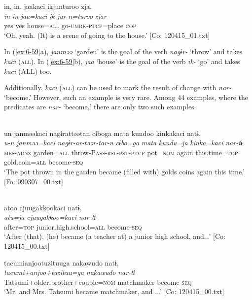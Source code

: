 {\TM}
\glll in,  in.  jaakaci  ikjunturoo  zja.\\
      \textit{in}  \textit{in}  \textit{jaa=kaci}  \textit{ik-jur-n=turoo}  \textit{zjar}\\
      yes  yes  house=\textsc{all}  go-\textsc{umrk}-\textsc{ptcp}=place  \textsc{cop}\\
\glt ‘Oh, yeah. (It) is a scene of going to the house.’ [Co: 120415\_01.txt]
\z

In (\ref{ex:6-59}a), \textit{janməə} ‘garden’ is the goal of the verb \textit{nagɨr-} ‘throw’ and takes \textit{kaci} (\textsc{all}). In (\ref{ex:6-59}b), \textit{jaa} ‘house’ is the goal of the verb \textit{ik-} ‘go’ and takes \textit{kaci} (ALL) too.

Additionally, \textit{kaci} (\textsc{all}) can be used to mark the result of change with \textit{nar-} ‘become.’ However, such an example is very rare. Among 44 examples, where the predicates are \textit{nar-} ‘become,’ there are only two such examples.

\ea\label{ex:6-60}
\ea{}\\
{\TM}
\glll  un  janməəkaci  nagɨrattəətan  cɨboga mata  kundoo  kinkakaci  natɨ,\\
\textit{u-n}  \textit{janməə=kaci}  \textit{nagɨr-ar-təər-tar-n}  \textit{cɨbo=ga} \textit{mata}  \textit{kundu=ja}  \textit{kinka=kaci}  \textit{nar-tɨ}\\
\textsc{mes}-\textsc{adnz}  garden=\textsc{all}  throw-P\textsc{ass}-\textsc{rsl}-\textsc{pst}-\textsc{ptcp}  pot=\textsc{nom} again  this.time=\textsc{top}  gold.coin=\textsc{all}  become-\textsc{seq}\\
\glt ‘The pot thrown in the garden became (filled with) golds coins again this time.’ [Fo: 090307\_00.txt]
\z

\ex{}\\
{\TM}
\glll  atoo  cjuugakkookaci  natɨ,\\
\textit{atu=ja}  \textit{cjuugakkoo=kaci}  \textit{nar-tɨ}\\
after=\textsc{top}  junior.high.school=\textsc{all}  become-\textsc{seq}\\
\glt ‘After (that), (he) became (a teacher at) a junior high school, and...’ [Co: 120415\_00.txt]
\z

\ex {\TM}  tacumianjootuzituuga  nakawudo  natɨ,\\
\glll \textit{tacumi+anjoo+tuzituu=ga}  \textit{nakawudo}  \textit{nar-tɨ}\\
Tatsumi+older.brother+couple=\textsc{nom}  matchmaker  become-\textsc{seq}\\
\glt ‘Mr. and Mrs. Tatsumi became matchmaker, and ...’ [Co: 120415\_00.txt]
\z


